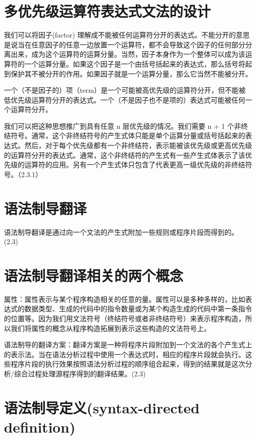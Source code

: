 \section*{多优先级运算符表达式文法的设计}

我们可以将因子(factor) 理解成不能被任何运算符分开的表达式。不能分开的意思是说当在任意因子的任意一边放置一个运算符，都不会导致这个因子的任何部分分离出来，成为这个运算符的运算分量。当然，因子本身作为一个整体可以成为该运算符的一个运算分量。如果这个因子是一个由括号括起来的表达式，那么括号将起到保护其不被分开的作用。如果因子就是一个运算分量，那么它当然不能被分开。

一个（不是因子的）项（term）是一个可能被高优先级的运算符分开，但不能被低优先级运算符分开的表达式。一个（不是因子也不是项的）表达式可能被任何一个运算符分开。

我们可以把这种思想推广到具有任意 n 层优先级的情况。我们需要 n + 1 个非终结符号。通常，这个非终结符号的产生式体只能是单个运算分量或括号括起来的表达式。然后，对于每个优先级都有一个非终结符，表示能被该优先级或更高优先级的运算符分开的表达式。通常，这个非终结符的产生式有一些产生式体表示了该优先级的运算符的应用。另有一个产生式体只包含了代表更高一级优先级的非终结符号。（2.3.1）


\section*{语法制导翻译}

语法制导翻译是通过向一个文法的产生式附加一些规则或程序片段而得到的。(2.3)


\section*{语法制导翻译相关的两个概念}

属性：属性表示与某个程序构造相关的任意的量。属性可以是多种多样的，比如表达式的数据类型、生成的代码中的指令数量或为某个构造生成的代码中第一条指令的位置等。因为我们用文法符号（终结符号或者非终结符号）来表示程序构造，所以我们将属性的概念从程序构造拓展到表示这些构造的文法符号上。

语法制导的翻译方案：翻译方案是一种将程序片段附加到一个文法的各个产生式上的表示法。当在语法分析过程中使用一个表达式时，相应的程序片段就会执行。这些程序片段的执行效果按照语法分析过程的顺序组合起来，得到的结果就是这次分析/综合过程处理源程序得到的翻译结果。(2.3)


\section*{语法制导定义(syntax-directed definition)}

